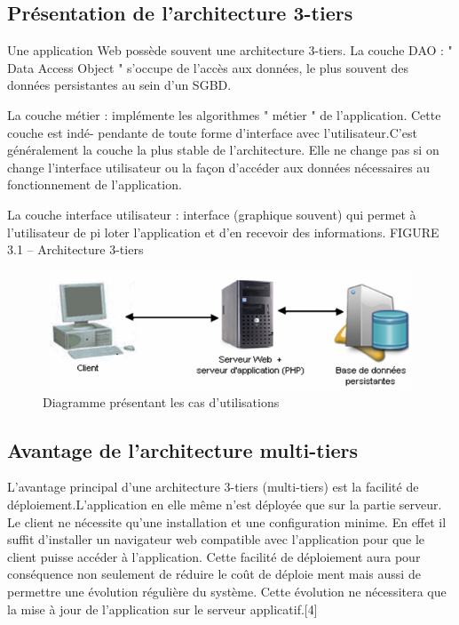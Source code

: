 \subsection{Présentation de l’architecture 3-tiers}
Une application Web possède souvent une architecture 3-tiers.
La couche DAO : " Data Access Object " s’occupe de l’accès aux données, le plus souvent des
données persistantes au sein d’un SGBD.

La couche métier : implémente les algorithmes " métier " de l’application. Cette couche est indé-
pendante de toute forme d’interface avec l’utilisateur.C’est généralement la couche la plus
stable de l’architecture. Elle ne change pas si on change l’interface utilisateur ou la façon
d’accéder aux données nécessaires au fonctionnement de l’application.

La couche interface utilisateur : interface (graphique souvent) qui permet à l’utilisateur de pi
loter l’application et d’en recevoir des informations.
FIGURE 3.1 – Architecture 3-tiers

\begin{figure}[H]
    \centering
    \includegraphics[height=100pt,width=400pt]{img/chapter3/tiers.png}
    \caption{Diagramme présentant les cas d'utilisations}
\end{figure}

\subsection{Avantage de l’architecture multi-tiers}
L’avantage principal d’une architecture 3-tiers (multi-tiers) est la facilité de déploiement.L’application
en elle même n’est déployée que sur la partie serveur.
Le client ne nécessite qu’une installation et une configuration minime.
En effet il suffit d’installer un navigateur web compatible avec l’application pour que le client
puisse accéder à l’application.
Cette facilité de déploiement aura pour conséquence non seulement de réduire le coût de déploie
ment mais aussi de permettre une évolution régulière du système. Cette évolution ne nécessitera
que la mise à jour de l’application sur le serveur applicatif.[4]

